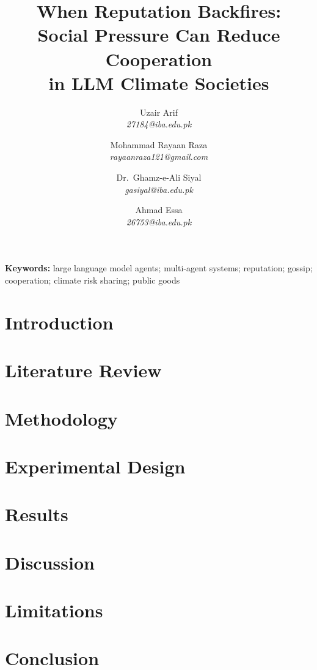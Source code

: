 \documentclass[10pt,twocolumn]{article}
\title{\textbf{When Reputation Backfires:\\
Social Pressure Can Reduce Cooperation\\
in LLM Climate Societies}}
\author{
Uzair Arif\\
\textit{27184@iba.edu.pk}
\and
Mohammad Rayaan Raza\\
\textit{rayaanraza121@gmail.com}
\and
Dr.\ Ghamz-e-Ali Siyal\\
\textit{gasiyal@iba.edu.pk}
\and
Ahmad Essa\\
\textit{26753@iba.edu.pk}
}
\date{}
\begin{document}
\maketitle
\thispagestyle{empty}

\begin{abstract}

\end{abstract}

\noindent\textbf{Keywords:} large language model agents; multi-agent systems; reputation; gossip; cooperation; climate risk sharing; public goods

\section{Introduction}


\section{Literature Review}


\section{Methodology}


\section{Experimental Design}


\section{Results}


\section{Discussion}


\section{Limitations}


\section{Conclusion}


{\small
\balance

}

\clearpage
\appendix
\onecolumn

\end{document}
